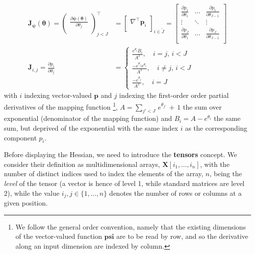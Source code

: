 \documentclass[long, final]{jobim}
\begin{document}
\begin{equation}
\label{eq:mapping-function-gradient}
\begin{aligned}
    \mathbf{J}_{\boldsymbol{\psi}} (\boldsymbol{\theta}) =
\begin{pmatrix}
\frac{\partial \boldsymbol{\psi}(\boldsymbol{\theta})}{\partial \theta_j} \\
\end{pmatrix}_{j < J }^\top &=
\begin{bmatrix}
\nabla^\top \boldsymbol{p}_i \\
\end{bmatrix}_{i \in \widetilde{J} } = \begin{bmatrix}
\frac{\partial p_1}{\partial \theta_1} & \ldots & \frac{\partial p_1}{\partial \theta_{J-1}}\\
\vdots & \ddots & \vdots \\
\frac{\partial p_J}{\partial \theta_1} & \ldots & \frac{\partial p_J}{\partial \theta_{J-1}}\\
\end{bmatrix}\\
\mathbf{J}_{i,j} =
   \frac{\partial p_i}{\partial \theta_{j}} &=
\begin{cases}
\frac{e^{\theta_i}B_i}{A^2 },\quad i = j, \, i < J\\
\frac{-e^{\theta_j}e^{\theta_i}}{A^2 }, \quad i \neq j, \, i < J\\
\frac{-e^{\theta_j}}{A^2}, \quad i=J
\end{cases}
  \end{aligned}
\end{equation}
with $i$ indexing vector-valued $\boldsymbol{p}$ and $j$ indexing the first-order order partial derivatives of the mapping function \footnote{We follow the general order convention, namely that the existing dimensions of the vector-valued function $\boldsymbol{psi}$ are to be read by row, and so the derivative along an input dimension are indexed by column.}, $A=\sum_{j' < J} \,e^{\theta_{j'}} \, +  \, 1$ the sum over exponential (denominator of the mapping function) and $B_i=A - e^{\theta_{i}}$ the same sum, but deprived of the exponential with the same index $i$ as the corresponding component $p_i$.

Before displaying the Hessian, we need to introduce the \textbf{tensors} concept. We consider their definition as multidimensional arrays, $\boldsymbol{X}[i_1, \ldots, i_n]$,  with the number of distinct indices used to index the elements of the array, $n$, being the \textit{level} of the tensor (a vector is hence of level 1, while standard matrices are level 2), while the value $i_j, j \in \{1, \ldots, n\}$ denotes the number of rows or columns at a given position.
\end{document}
